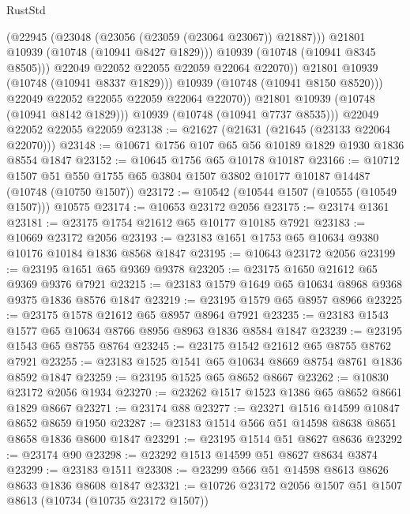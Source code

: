 \begin{lexlean}{RustStd}
\begin{coremodule}
{\begin{coremodule}
{{{{{                        (@22945 (@23048 (@23056 (@23059 (@23064 @23067)) @21887)))
                        @21801
                        @10939
                        (@10748 (@10941 @8427 @1829)))
                      @10939
                      (@10748 (@10941 @8345 @8505)))
                    @22049
                    @22052
                    @22055
                    @22059
                    @22064
                    @22070))
                @21801
                @10939
                (@10748 (@10941 @8337 @1829)))
              @10939
              (@10748 (@10941 @8150 @8520)))
            @22049
            @22052
            @22055
            @22059
            @22064
            @22070))
        @21801
        @10939
        (@10748 (@10941 @8142 @1829)))
      @10939
      (@10748 (@10941 @7737 @8535)))
    @22049
    @22052
    @22055
    @22059
@23138 := @21627 (@21631 (@21645 (@23133 @22064 @22070)))
@23148 := @10671 @1756 @107 @65 @56 @10189 @1829 @1930 @1836 @8554 @1847
@23152 := @10645 @1756 @65 @10178 @10187
@23166 := @10712
    @1507
    @51
    @550
    @1755
    @65
    @3804
    @1507
    @3802
    @10177
    @10187
    @14487
    (@10748 (@10750 @1507))
@23172 := @10542 (@10544 @1507 (@10555 (@10549 @1507))) @10575
@23174 := @10653 @23172 @2056
@23175 := @23174 @1361
@23181 := @23175 @1754 @21612 @65 @10177 @10185 @7921
@23183 := @10669 @23172 @2056
@23193 := @23183 @1651 @1753 @65 @10634 @9380 @10176 @10184 @1836 @8568 @1847
@23195 := @10643 @23172 @2056
@23199 := @23195 @1651 @65 @9369 @9378
@23205 := @23175 @1650 @21612 @65 @9369 @9376 @7921
@23215 := @23183 @1579 @1649 @65 @10634 @8968 @9368 @9375 @1836 @8576 @1847
@23219 := @23195 @1579 @65 @8957 @8966
@23225 := @23175 @1578 @21612 @65 @8957 @8964 @7921
@23235 := @23183 @1543 @1577 @65 @10634 @8766 @8956 @8963 @1836 @8584 @1847
@23239 := @23195 @1543 @65 @8755 @8764
@23245 := @23175 @1542 @21612 @65 @8755 @8762 @7921
@23255 := @23183 @1525 @1541 @65 @10634 @8669 @8754 @8761 @1836 @8592 @1847
@23259 := @23195 @1525 @65 @8652 @8667
@23262 := @10830 @23172 @2056 @1934
@23270 := @23262 @1517 @1523 @1386 @65 @8652 @8661 @1829 @8667
@23271 := @23174 @88
@23277 := @23271 @1516 @14599 @10847 @8652 @8659 @1950
@23287 := @23183 @1514 @566 @51 @14598 @8638 @8651 @8658 @1836 @8600 @1847
@23291 := @23195 @1514 @51 @8627 @8636
@23292 := @23174 @90
@23298 := @23292 @1513 @14599 @51 @8627 @8634 @3874
@23299 := @23183 @1511
@23308 := @23299 @566 @51 @14598 @8613 @8626 @8633 @1836 @8608 @1847
@23321 := @10726
    @23172
    @2056
    @1507
    @51
    @1507
    @8613
    (@10734 (@10735 @23172 @1507))
}}}}}
\end{coremodule}}
\end{coremodule}
\end{lexlean}
